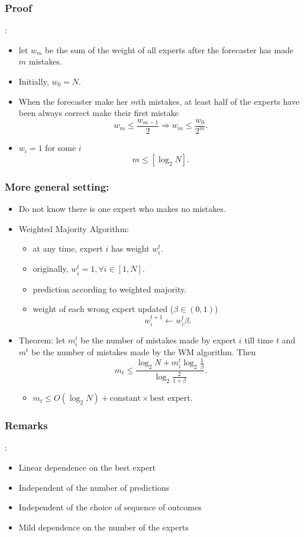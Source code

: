 \documentclass{beamer}
\begin{document}
\begin{frame}
\frametitle{Proof}:
\begin{itemize}
\item let $w_m$ be the sum of the weight of all experts after the forecaster has made $m$ mistakes.
\item Initially, $w_0 = N.$
\item When the forecaster make her $m$th mistakes, at least half of the experts have been always correct make their first mistake
\begin{equation*}
w_m \le \frac{w_{m-1}}{2}\Longrightarrow w_m\le \frac{w_0}{2^m}.
\end{equation*} 
\item $w_i =1$  for some $i$
\begin{equation*}
m\le [\log_2 N].
\end{equation*}
\end{itemize}


\end{frame}
\begin{frame}
\frametitle{More general setting:}
\begin{itemize}
\item Do not know there is one expert who makes no mistakes. 
\item Weighted Majority Algorithm:
\begin{itemize}
	\item at any time, expert $i$ has weight $w_i^t$.
	\item originally, $w_i^t = 1, \forall i\in[1,N]$.
	\item prediction according to weighted majority. 
	\item weight of each wrong expert updated ($\beta\in(0,1)$)
	$$w_i^{t+1}\leftarrow w_i^t\beta.$$
\end{itemize}
\item Theorem: let $m_i^t$ be the number of mistakes made by expert $i$ till time $t$ and $m^t$ be the number of mistakes made by the WM algorithm. Then
$$m_t \le \frac{\log_2 N+m_i^t\log_2\frac{1}{\beta}}{\log_2 \frac{2}{1+\beta}}.$$
\begin{itemize}
\item $m_t\le O(\log_2 N)+\text{constant}\times\text{best expert}$.
\end{itemize}

\end{itemize}
\end{frame}


\begin{frame}
\frametitle{Remarks}:
\begin{itemize}
\item Linear dependence on the best expert
\item Independent of the number of predictions
\item Independent of the choice of sequence of outcomes
\item Mild dependence on the number of the experts
\end{itemize}


\end{frame}
\end{document}
